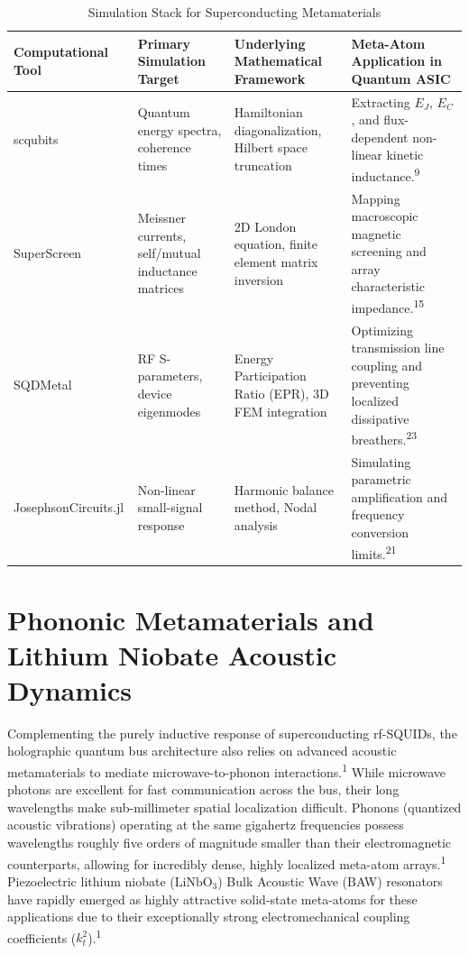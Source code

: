 \documentclass[11pt, a4paper]{article}
\begin{document}
\begin{table}[htbp]
\centering
\renewcommand{\arraystretch}{1.5}
\begin{tabularx}{\textwidth}{>{\raggedright\arraybackslash}p{3cm} >{\raggedright\arraybackslash}X >{\raggedright\arraybackslash}X >{\raggedright\arraybackslash}X}
\toprule
\textbf{Computational Tool} & \textbf{Primary Simulation Target} & \textbf{Underlying Mathematical Framework} & \textbf{Meta-Atom Application in Quantum ASIC} \\
\midrule
scqubits & Quantum energy spectra, coherence times & Hamiltonian diagonalization, Hilbert space truncation & Extracting $E_J$, $E_C$, and flux-dependent non-linear kinetic inductance.\textsuperscript{9} \\
SuperScreen & Meissner currents, self/mutual inductance matrices & 2D London equation, finite element matrix inversion & Mapping macroscopic magnetic screening and array characteristic impedance.\textsuperscript{15} \\
SQDMetal & RF S-parameters, device eigenmodes & Energy Participation Ratio (EPR), 3D FEM integration & Optimizing transmission line coupling and preventing localized dissipative breathers.\textsuperscript{23} \\
JosephsonCircuits.jl & Non-linear small-signal response & Harmonic balance method, Nodal analysis & Simulating parametric amplification and frequency conversion limits.\textsuperscript{21} \\
\bottomrule
\end{tabularx}
\caption{Simulation Stack for Superconducting Metamaterials}
\end{table}

\section{Phononic Metamaterials and Lithium Niobate Acoustic Dynamics}

Complementing the purely inductive response of superconducting rf-SQUIDs, the holographic quantum bus architecture also relies on advanced acoustic metamaterials to mediate microwave-to-phonon interactions.\textsuperscript{1} While microwave photons are excellent for fast communication across the bus, their long wavelengths make sub-millimeter spatial localization difficult. Phonons (quantized acoustic vibrations) operating at the same gigahertz frequencies possess wavelengths roughly five orders of magnitude smaller than their electromagnetic counterparts, allowing for incredibly dense, highly localized meta-atom arrays.\textsuperscript{1} Piezoelectric lithium niobate ($\text{LiNbO}_3$) Bulk Acoustic Wave (BAW) resonators have rapidly emerged as highly attractive solid-state meta-atoms for these applications due to their exceptionally strong electromechanical coupling coefficients ($k_t^2$).\textsuperscript{1}
\end{document}
